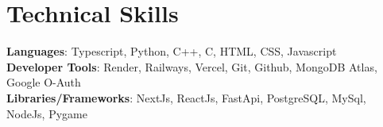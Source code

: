 \documentclass[letterpaper,11pt]{article}
\begin{document}
\section{Technical Skills}
 \begin{itemize}[leftmargin=0.15in, label={}]
    \small{\item{   
     \textbf{Languages}{: Typescript, Python, C++, C, HTML, CSS, Javascript} \\[1mm]
     \textbf{Developer Tools}{: Render, Railways, Vercel, Git, Github, MongoDB Atlas, Google O-Auth} \\[1mm]
     \textbf{Libraries/Frameworks}{: NextJs, ReactJs, FastApi, PostgreSQL, MySql, NodeJs, Pygame } \\ [1mm]
    }}
 \end{itemize}
 \vspace{-16pt}
 \vspace{3pt}
\vspace{10pt}

\vspace{-15pt}
\end{document}
